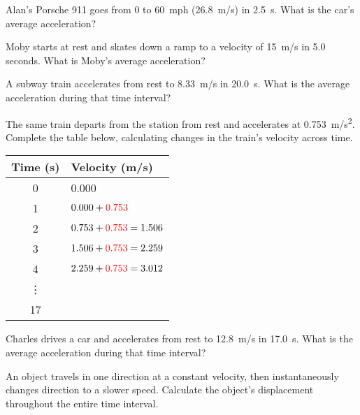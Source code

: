\documentclass[dvipsnames]{article}
\begin{document}
\begin{exercise} \label{eBsToU}
    Alan's Porsche 911 goes from 0 to \SI{60}{mph} (\SI{26.8}{m/s}) in \SI{2.5}{s}. What is the car's average acceleration? 
\end{exercise}


\begin{exercise} \label{kVZPeG}
  Moby starts at rest and skates down a ramp to a velocity of \SI{15}{m/s} in 5.0 seconds. What is Moby's average acceleration? 
\end{exercise}

\begin{exercise} \label{Vth5N8}
    A subway train accelerates from rest to \SI{8.33}{m/s} in \SI{20.0}{s}. What is the average acceleration during that time interval?
\end{exercise}

\begin{exercise}
    The same train departs from the station from rest and accelerates at \SI{0.753}{m/s^2}. Complete the table below, calculating changes in the train's velocity across time.

\begin{center}
    \begin{tabular}{c|l}
        \textbf{Time (s)} & \textbf{Velocity (m/s)} \\
        \hline
        0 & 0.000\\
        1 & $0.000 + {\color{red}0.753}$\\
        2 & $0.753 + {\color{red}0.753} = 1.506$ \\
        3 & $1.506 + {\color{red}0.753} = 2.259$ \\
        4 & $2.259 + {\color{red}0.753} = 3.012$ \\
        \vdots &  \\
        17 &  \\
    \end{tabular}
\end{center}
\end{exercise}


\begin{exercise} \label{XSJU8b}
    Charles drives a car and accelerates from rest to \SI{12.8}{m/s} in \SI{17.0}{s}. What is the average acceleration during that time interval?
\end{exercise}

\begin{exercise} \label{57fIMa}
An object travels in one direction at a constant velocity, then instantaneously changes direction to a slower speed. Calculate the object's displacement throughout the entire time interval.
\end{exercise}
\end{document}
